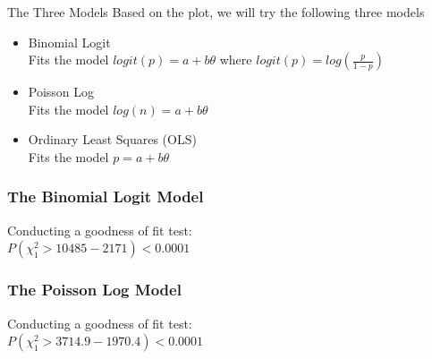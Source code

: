 \begin{frame}{The Three Models}
Based on the plot, we will try the following three models
\begin{itemize}
\item Binomial Logit\\
Fits the model $logit(p)=a+b\theta$ where $logit(p)=log(\frac{p}{1-p})$\\
\item Poisson Log\\
Fits the model $log(n)=a+b\theta$\\
\item Ordinary Least Squares (OLS)\\
Fits the model $p=a+b\theta$\\
\end{itemize}
\end{frame}




\begin{frame}\frametitle{The Binomial Logit Model}
{\fontsize{8}{3} \color{RBlue} }

Conducting a goodness of fit test: \\
$P(\chi^{2}_{1}>10485-2171)<0.0001$\\

\end{frame}

\begin{frame}\frametitle{The Poisson Log Model}
{\fontsize{8}{3} \color{RBlue} }

Conducting a goodness of fit test: \\
$P(\chi^{2}_{1}>3714.9-1970.4)<0.0001$\\

\end{frame}



